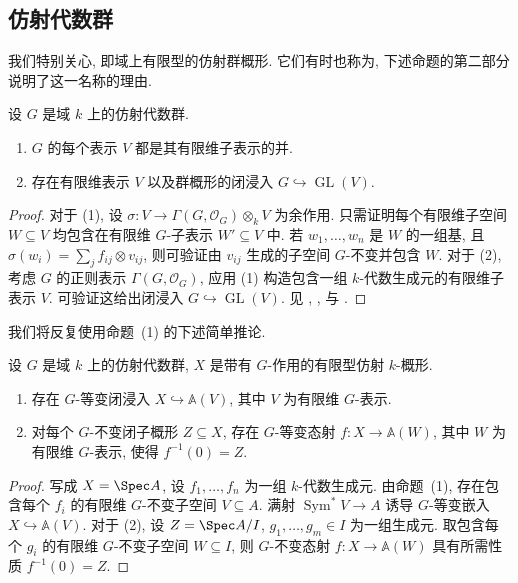 \subsection{仿射代数群}\label{src:B.1.3-subsection}
我们特别关心, 即域上有限型的仿射群概形. 它们有时也称为, 下述命题的第二部分说明了这一名称的理由.
\begin{proposition}\label{src:B.1.20}
设 $G$ 是域 $k$ 上的仿射代数群.
\begin{enumerate}[(1)]
\item $G$ 的每个表示 $V$ 都是其有限维子表示的并.
\item 存在有限维表示 $V$ 以及群概形的闭浸入 $G\hookrightarrow\operatorname{GL}(V)$.
\end{enumerate}
\end{proposition}
\begin{proof}
对于 (1), 设 $\sigma:V\to\Gamma(G,\mathcal O_G)\otimes_k V$ 为余作用. 只需证明每个有限维子空间 $W\subseteq V$ 均包含在有限维 $G$-子表示 $W'\subseteq V$ 中. 若 $w_1,\ldots,w_n$ 是 $W$ 的一组基, 且 $\sigma(w_i)=\sum_j f_{ij}\otimes v_{ij}$, 则可验证由 $v_{ij}$ 生成的子空间 $G$-不变并包含 $W$. 对于 (2), 考虑 $G$ 的正则表示 $\Gamma(G,\mathcal O_G)$, 应用 (1) 构造包含一组 $k$-代数生成元的有限维子表示 $V$. 可验证这给出闭浸入 $G\hookrightarrow\operatorname{GL}(V)$. 见 \cite[\S I.$1.9$--$10$]{Bor91}, \cite[\S$8.6$]{Hum75}, \cite[命题 $2.3.6$ 及定理 $2.3.7$]{Spr98} 与 \cite[命题 $4.7$, 推论 $4.10$]{Mil17}.
\end{proof}
我们将反复使用命题~(1) 的下述简单推论.
\begin{proposition}\label{src:B.1.21}
设 $G$ 是域 $k$ 上的仿射代数群, $X$ 是带有 $G$-作用的有限型仿射 $k$-概形.
\begin{enumerate}[(1)]
\item 存在 $G$-等变闭浸入 $X\hookrightarrow\mathbb A(V)$, 其中 $V$ 为有限维 $G$-表示.
\item 对每个 $G$-不变闭子概形 $Z\subseteq X$, 存在 $G$-等变态射 $f:X\to\mathbb A(W)$, 其中 $W$ 为有限维 $G$-表示, 使得 $f^{-1}(0)=Z$.
\end{enumerate}
\end{proposition}
\begin{proof}
写成 $X=\Spec A$, 设 $f_1,\ldots,f_n$ 为一组 $k$-代数生成元. 由命题~(1), 存在包含每个 $f_i$ 的有限维 $G$-不变子空间 $V\subseteq A$. 满射 $\operatorname{Sym}^*V\to A$ 诱导 $G$-等变嵌入 $X\hookrightarrow\mathbb A(V)$. 对于 (2), 设 $Z=\Spec A/I$, $g_1,\ldots,g_m\in I$ 为一组生成元. 取包含每个 $g_i$ 的有限维 $G$-不变子空间 $W\subseteq I$, 则 $G$-不变态射 $f:X\to\mathbb A(W)$ 具有所需性质 $f^{-1}(0)=Z$.
\end{proof}

